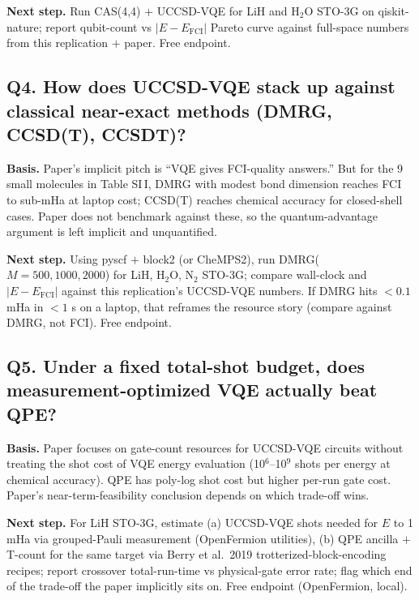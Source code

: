 \textbf{Next step.} Run CAS(4,4) $+$ UCCSD-VQE for LiH and H$_2$O STO-3G
on qiskit-nature; report qubit-count vs $|E-E_\text{FCI}|$ Pareto curve
against full-space numbers from this replication $+$ paper. Free endpoint.

\subsection*{Q4. How does UCCSD-VQE stack up against classical near-exact methods (DMRG, CCSD(T), CCSDT)?}
\textbf{Basis.} Paper's implicit pitch is ``VQE gives FCI-quality
answers.'' But for the 9 small molecules in Table SI\,I, DMRG with modest
bond dimension reaches FCI to sub-mHa at laptop cost; CCSD(T) reaches
chemical accuracy for closed-shell cases. Paper does not benchmark
against these, so the quantum-advantage argument is left implicit and
unquantified.

\textbf{Next step.} Using pyscf $+$ block2 (or CheMPS2), run
DMRG($M=500,1000,2000$) for LiH, H$_2$O, N$_2$ STO-3G; compare wall-clock
and $|E-E_\text{FCI}|$ against this replication's UCCSD-VQE numbers. If
DMRG hits $<0.1$ mHa in $<1$ s on a laptop, that reframes the resource
story (compare against DMRG, not FCI). Free endpoint.

\subsection*{Q5. Under a fixed total-shot budget, does measurement-optimized VQE actually beat QPE?}
\textbf{Basis.} Paper focuses on gate-count resources for UCCSD-VQE
circuits without treating the shot cost of VQE energy evaluation
(10$^6$--10$^9$ shots per energy at chemical accuracy). QPE has
poly-log shot cost but higher per-run gate cost. Paper's
near-term-feasibility conclusion depends on which trade-off wins.

\textbf{Next step.} For LiH STO-3G, estimate (a) UCCSD-VQE shots needed
for $E$ to 1 mHa via grouped-Pauli measurement (OpenFermion utilities),
(b) QPE ancilla $+$ T-count for the same target via Berry et al.\ 2019
trotterized-block-encoding recipes; report crossover total-run-time vs
physical-gate error rate; flag which end of the trade-off the paper
implicitly sits on. Free endpoint (OpenFermion, local).
